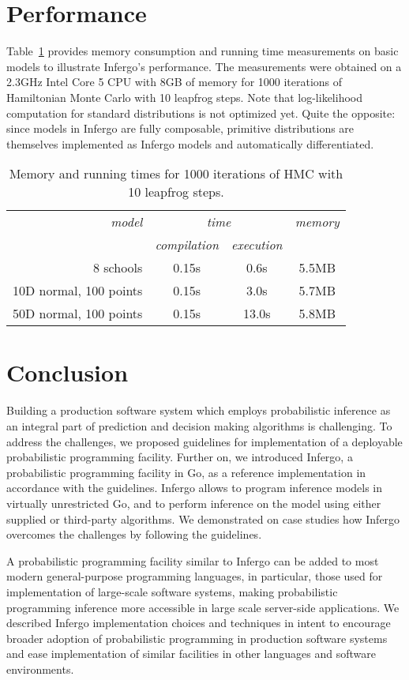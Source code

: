 \documentclass[sigplan,review,10pt,anonymous]{acmart}
\begin{document}
\begin{sloppypar}
\section{Performance}

Table~\ref{tab:memory-runtime} provides memory consumption and
running time measurements on basic models to illustrate
Infergo's performance.  The measurements were obtained on a
2.3GHz Intel Core 5 CPU with 8GB of memory for 1000 iterations
of Hamiltonian Monte Carlo with 10 leapfrog steps. Note that
log-likelihood computation for standard distributions is not
optimized yet. Quite the opposite: since models in Infergo are
fully composable, primitive distributions are themselves
implemented as Infergo models and automatically differentiated.

{\smaller
\begin{table}[H]
\caption{Memory and running times for 1000 iterations
of HMC with 10 leapfrog steps.}
\label{tab:memory-runtime}
\begin{tabular}{r | c |  c | c}
	{\it model}  & \multicolumn{2}{c|}{\it time} & {\it memory} \\ 
	 & {\it compilation} & {\it execution} & \\\hline
	8 schools & 0.15s & 0.6s & 5.5MB \\
	10D normal, 100 points & 0.15s & 3.0s & 5.7MB \\
	50D normal, 100 points & 0.15s & 13.0s & 5.8MB 
\end{tabular}
\end{table}}

\section{Conclusion}

Building a production software system which employs
probabilistic inference as an integral part of prediction and
decision making algorithms is challenging. To address the
challenges, we proposed guidelines for implementation of a
deployable probabilistic programming facility. Further on, we
introduced Infergo, a probabilistic programming facility in Go,
as a reference implementation in accordance with the guidelines.
Infergo allows to program inference models in virtually
unrestricted Go, and to perform inference on the model using
either supplied or third-party algorithms. We demonstrated on
case studies how Infergo overcomes the challenges by following
the guidelines.

A probabilistic programming facility similar to Infergo can be
added to most modern general-purpose programming languages, in
particular, those used for implementation of large-scale software
systems, making probabilistic programming inference more
accessible in large scale server-side applications. We described
Infergo implementation choices and techniques in intent
to encourage broader adoption of probabilistic programming in
production software systems and ease implementation of similar
facilities in other languages and software environments.


\end{sloppypar}
\end{document}
